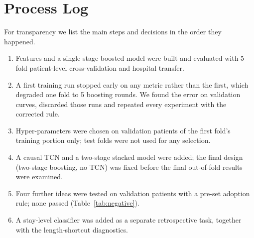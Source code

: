 \documentclass[preprint,12pt]{elsarticle}
\begin{document}
\section{Process Log}
For transparency we list the main steps and decisions in the order they happened.
\begin{enumerate}
\item Features and a single-stage boosted model were built and evaluated with 5-fold patient-level cross-validation and hospital transfer.
\item A first training run stopped early on any metric rather than the first, which degraded one fold to 5 boosting rounds. We found the error on validation curves, discarded those runs and repeated every experiment with the corrected rule.
\item Hyper-parameters were chosen on validation patients of the first fold's training portion only; test folds were not used for any selection.
\item A causal TCN and a two-stage stacked model were added; the final design (two-stage boosting, no TCN) was fixed before the final out-of-fold results were examined.
\item Four further ideas were tested on validation patients with a pre-set adoption rule; none passed (Table~\ref{tab:negative}).
\item A stay-level classifier was added as a separate retrospective task, together with the length-shortcut diagnostics.
\end{enumerate}
\end{document}
